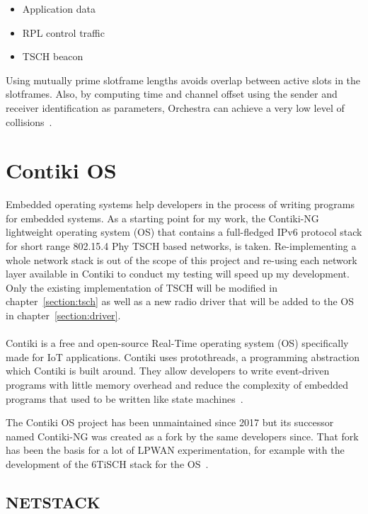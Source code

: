 \begin{itemize}
  \item Application data
  \item RPL control traffic
  \item TSCH beacon
\end{itemize}

Using mutually prime slotframe lengths avoids overlap between active slots in
the slotframes.
Also, by computing time and channel offset using the sender and receiver
identification as parameters, Orchestra can achieve a very low level of
collisions~\cite{duquennoy2015}.

\section{Contiki OS}

Embedded operating systems help developers in the process of writing programs
for embedded systems.
As a starting point for my work, the Contiki-NG lightweight operating system (OS)
that contains a full-fledged IPv6 protocol stack for short range 802.15.4 Phy
TSCH based networks, is taken.
Re-implementing a whole network stack is out of the scope of this project and
re-using each network layer available in Contiki to conduct my testing will
speed up my development.
Only the existing implementation of TSCH will be modified in
chapter~\ref{section:tsch} as well as a new radio driver that will be added to
the OS in chapter~\ref{section:driver}.

\paragraph{}

Contiki is a free and open-source Real-Time operating system (OS) specifically made
for IoT applications.
Contiki uses protothreads, a programming abstraction which Contiki is
built around.
They allow developers to write event-driven programs with little memory overhead and
reduce the complexity of embedded programs that used to be written
like state machines~\cite{10.1145/1182807.1182811}.

The Contiki OS project has been unmaintained since 2017 but its
successor named Contiki-NG was created as a fork by the same developers since.
That fork has been the basis for a lot of LPWAN experimentation, for example
with the development of the 6TiSCH stack for the OS~\cite{Duquennoy2017TSCHA6}.

\subsection{NETSTACK}

